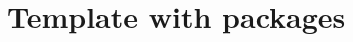 \documentclass[12pt]{article}
\begin{document}

\setlength\parindent{0pt}

\section*{Template with packages}
\end{document}
